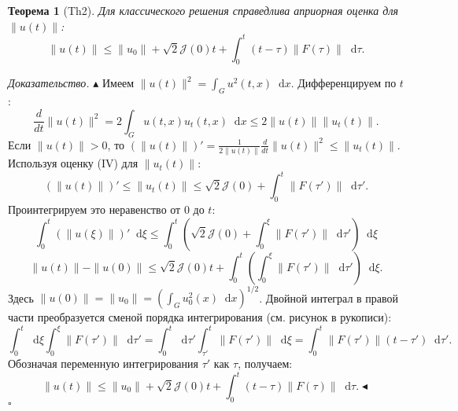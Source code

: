 \documentclass[12pt, a4paper]{article}
\newcommand{\dd}{\mathop{}\!\mathrm{d}} %
\newtheorem{theorem}{Теорема}[section] %
\newenvironment{proof}[1][\proofname]{\par\noindent\textit{#1.}\quad}{\hfill$\square$}
\renewcommand{\proofname}{Доказательство}
\begin{document}
\begin{theorem}[Th2]
\label{thm:apriori_u}
Для классического решения справедлива априорная оценка для $\|u(t)\|$:
\begin{equation} \label{eq:apriori_u}
\|u(t)\| \le \|u_0\| + \sqrt{2} \mathcal{J}(0) t + \int_0^t (t-\tau) \|F(\tau)\| \dd\tau.
\end{equation}
\end{theorem}
\begin{proof}
$\blacktriangle$ Имеем $\|u(t)\|^2 = \int_G u^2(t,x) \dd x$. Дифференцируем по $t$:
$$ \frac{d}{dt} \|u(t)\|^2 = 2 \int_G u(t,x) u_t(t,x) \dd x \le 2 \|u(t)\| \|u_t(t)\|. $$
Если $\|u(t)\| > 0$, то $(\|u(t)\|)' = \frac{1}{2\|u(t)\|} \frac{d}{dt} \|u(t)\|^2 \le \|u_t(t)\|$.
Используя оценку (IV) для $\|u_t(t)\|$:
$$ (\|u(t)\|)' \le \|u_t(t)\| \le \sqrt{2} \mathcal{J}(0) + \int_0^t \|F(\tau')\| \dd\tau'. $$
Проинтегрируем это неравенство от $0$ до $t$:
$$ \int_0^t (\|u(\xi)\|)' \dd\xi \le \int_0^t \left(\sqrt{2} \mathcal{J}(0) + \int_0^\xi \|F(\tau')\| \dd\tau' \right) \dd\xi $$
$$ \|u(t)\| - \|u(0)\| \le \sqrt{2} \mathcal{J}(0) t + \int_0^t \left( \int_0^\xi \|F(\tau')\| \dd\tau' \right) \dd\xi. $$
Здесь $\|u(0)\| = \|u_0\| = \left(\int_G u_0^2(x) \dd x\right)^{1/2}$.
Двойной интеграл в правой части преобразуется сменой порядка интегрирования (см. рисунок в рукописи):
$$ \int_0^t \dd\xi \int_0^\xi \|F(\tau')\| \dd\tau' = \int_0^t \dd\tau' \int_{\tau'}^t \|F(\tau')\| \dd\xi = \int_0^t \|F(\tau')\| (t-\tau') \dd\tau'. $$
Обозначая переменную интегрирования $\tau'$ как $\tau$, получаем:
$$ \|u(t)\| \le \|u_0\| + \sqrt{2} \mathcal{J}(0) t + \int_0^t (t-\tau) \|F(\tau)\| \dd\tau. \blacktriangleleft $$
\end{proof}
\end{document}
